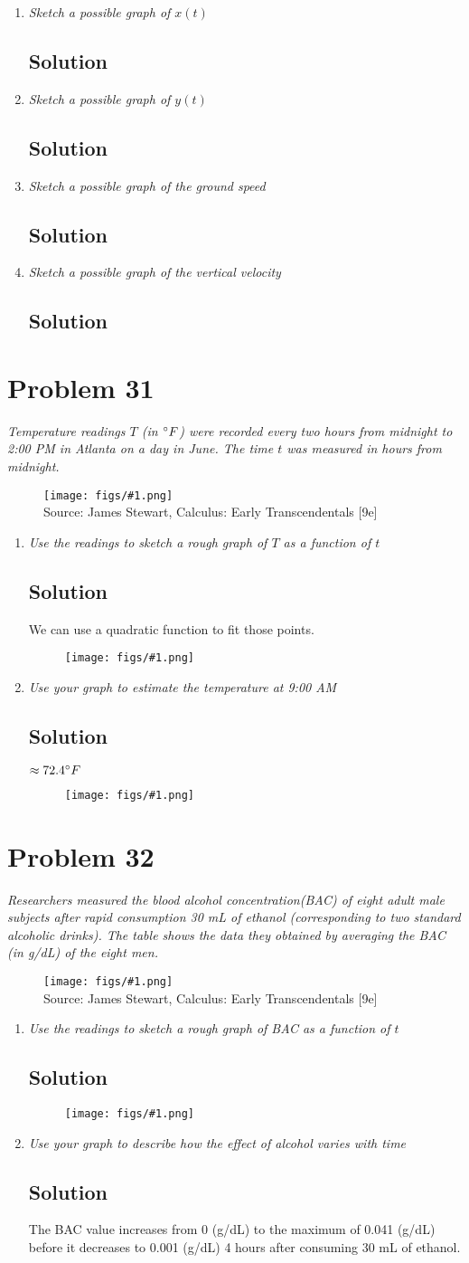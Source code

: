 \documentclass[11pt]{article}
\newcommand{\soln}{\subsection*}
\newcommand{\qn}{\textit}
\newcommand{\imagesource}[1]{{\footnotesize Source: #1}}
\newcommand{\imgqn}[1]{
	\begin{figure}[h]
		\centering
		\texttt{[image: figs/\#1.png]}\\
		\imagesource{James Stewart, Calculus: Early Transcendentals [9e]}
	\end{figure}
}
\newcommand{\imgsoln}[1]{
	\begin{figure}[h]
		\centering
		\texttt{[image: figs/\#1.png]}
	\end{figure}
}
\begin{document}
\begin{enumerate}
	\item \qn{Sketch a possible graph of $x(t)$}
	\soln{Solution}
	
	\item \qn{Sketch a possible graph of $y(t)$}
	\soln{Solution}
	
	\item \qn{Sketch a possible graph of the ground speed}
	\soln{Solution}
	
	\item \qn{Sketch a possible graph of the vertical velocity}
	\soln{Solution}
\end{enumerate}

\section*{Problem 31}

\qn{Temperature readings $T$ (in $\degree F$) were recorded every two hours from midnight to 2:00 PM in Atlanta on a day in June. The time $t$ was measured in hours from midnight.}

\imgqn{1.1.31}

\begin{enumerate}
	\item \qn{Use the readings to sketch a rough graph of $T$ as a function of $t$}
	\soln{Solution}
	We can use a quadratic function to fit those points.
	\imgsoln{1.1.31_ans.a}
	
	\item \qn{Use your graph to estimate the temperature at 9:00 AM}
	\soln{Solution}
	$\approx 72.4 \degree F$
	\imgsoln{1.1.31_ans.b}
\end{enumerate}

\section*{Problem 32}

\qn{Researchers measured the blood alcohol concentration(BAC) of eight adult male subjects after rapid consumption 30 mL of ethanol (corresponding to two standard alcoholic drinks). The table shows the data they obtained by averaging the BAC (in g/dL) of the eight men.}

\imgqn{1.1.32}

\begin{enumerate}
	\item \qn{Use the readings to sketch a rough graph of BAC as a function of $t$}
	\soln{Solution}
	\imgsoln{1.1.32_ans.a}
	
	\item \qn{Use your graph to describe how the effect of alcohol varies with time}
	\soln{Solution}
	The BAC value increases from 0 (g/dL) to the maximum of 0.041 (g/dL) before it decreases to 0.001 (g/dL) 4 hours after consuming 30 mL of ethanol.
\end{enumerate}
\end{document}

